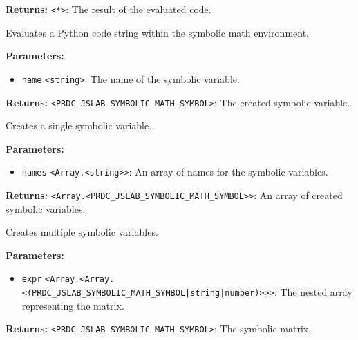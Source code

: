 \documentclass[12pt,a4paper]{article}
\begin{document}
\noindent \textbf{Returns:} \texttt{<*>}: The result of the evaluated code.

\noindent Evaluates a Python code string within the symbolic math environment.

\vspace{5mm}
\noindent {}


\noindent \textbf{Parameters:}
\begin{itemize}
  \item \texttt{name} \texttt{<string>}: The name of the symbolic variable.
\end{itemize}

\noindent \textbf{Returns:} \texttt{<PRDC\_JSLAB\_SYMBOLIC\_MATH\_SYMBOL>}: The created symbolic variable.

\noindent Creates a single symbolic variable.

\vspace{5mm}
\noindent {}


\noindent \textbf{Parameters:}
\begin{itemize}
  \item \texttt{names} \texttt{<Array.<string>>}: An array of names for the symbolic variables.
\end{itemize}

\noindent \textbf{Returns:} \texttt{<Array.<PRDC\_JSLAB\_SYMBOLIC\_MATH\_SYMBOL>>}: An array of created symbolic variables.

\noindent Creates multiple symbolic variables.

\vspace{5mm}
\noindent {}


\noindent \textbf{Parameters:}
\begin{itemize}
  \item \texttt{expr} \texttt{<Array.<Array.<(PRDC\_JSLAB\_SYMBOLIC\_MATH\_SYMBOL|string|number)>>>}: The nested array representing the matrix.
\end{itemize}

\noindent \textbf{Returns:} \texttt{<PRDC\_JSLAB\_SYMBOLIC\_MATH\_SYMBOL>}: The symbolic matrix.
\end{document}
